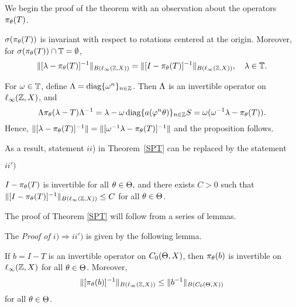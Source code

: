 We begin the proof of the theorem with
an observation about the operators $\pi_\theta(T)$.

\begin{prop}\label{p4.3}
$\sigma(\pi_\theta (T))$ is invariant
with respect to rotations centered at
the origin.  Moreover, for $\sigma (\pi_\theta(T)) \cap {\Bbb{T}} =
\emptyset$, \[
\| [\lambda-\pi_\theta(T)]^{-1} \|_{B(\ell_\infty({\Bbb{Z}},X))} = \| [I-\pi_\theta(T)]^{-1}
\|_{B(\ell_\infty({\Bbb{Z}},X))},\quad \lambda\in{\Bbb{T}}.\]
\end{prop}

\begin{pf}
For $\omega\in{\Bbb{T}}$, define $\Lambda=\operatorname{diag}\{\omega^n\}_{n\in{\Bbb{Z}}}$.
Then $\Lambda$ is an invertible operator on $\ell_\infty({\Bbb{Z}},X)$, and
$$
\Lambda\pi_\theta(\lambda-T)
\Lambda^{-1}=\lambda-\omega\operatorname{diag}\{a(\varphi^{n}\theta)\}_{n\in{\Bbb{Z}}}S
 =\omega(\omega^{-1}\lambda -\pi_\theta(T)).
$$
Hence,
$\|[\lambda-\pi_\theta(T)]^{-1}\|=\|[\omega^{-1}\lambda-\pi_\theta(T)]^{-1}\|$
and the proposition follows. \end{pf}

As a result, statement $ii$) in Theorem~\ref{SPT} can be
replaced by the statement
 \bigskip
\begin{list}{$ii')$}
\item  $I-\pi_\theta(T)$ is invertible
for all $\theta \in \Theta,$ and there exists $C>0$ such that
$\|[I-\pi_\theta(T)]^{-1} \|_{B(\ell_\infty({\Bbb{Z}},X))} \le C$ for all $\theta \in \Theta$.
\end{list}

\bigskip

The proof of Theorem \ref{SPT} will follow from a series of
lemmas.

The {\em Proof of $i)\Rightarrow ii')$} is
given by the following lemma.

\begin{lem} If $b=I-T$ is an invertible operator on $C_0(\Theta,X)$,
then $\pi_\theta(b)$ is invertible on $\ell_\infty({\Bbb{Z}},X)$ for all $\theta\in \Theta$.
Moreover, \[\|[\pi_\theta(b)]^{-1}\|_{B(\ell_\infty({\Bbb{Z}},X))}\leq \|b^{-1}\|_{B(C_0(\Theta,X))}\] for
all $\theta\in \Theta$.
\end{lem}

